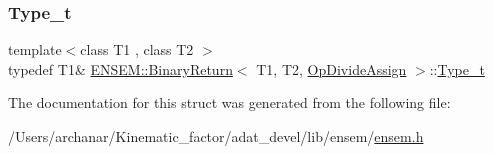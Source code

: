 \mbox{\label{structENSEM_1_1BinaryReturn_3_01T1_00_01T2_00_01OpDivideAssign_01_4_a02fea7e2c56cca02f54cf841a28052d3}} 
\subsubsection{\texorpdfstring{Type\_t}{Type\_t}\hspace{0.1cm}{\footnotesize\ttfamily [2/2]}}
{\footnotesize\ttfamily template$<$class T1 , class T2 $>$ \\
typedef T1\& \mbox{\hyperlink{structENSEM_1_1BinaryReturn}{E\+N\+S\+E\+M\+::\+Binary\+Return}}$<$ T1, T2, \mbox{\hyperlink{structENSEM_1_1OpDivideAssign}{Op\+Divide\+Assign}} $>$\+::\mbox{\hyperlink{structENSEM_1_1BinaryReturn_3_01T1_00_01T2_00_01OpDivideAssign_01_4_a02fea7e2c56cca02f54cf841a28052d3}{Type\+\_\+t}}}



The documentation for this struct was generated from the following file\+:\begin{DoxyCompactItemize}
\item 
/\+Users/archanar/\+Kinematic\+\_\+factor/adat\+\_\+devel/lib/ensem/\mbox{\hyperlink{lib_2ensem_2ensem_8h}{ensem.\+h}}\end{DoxyCompactItemize}
